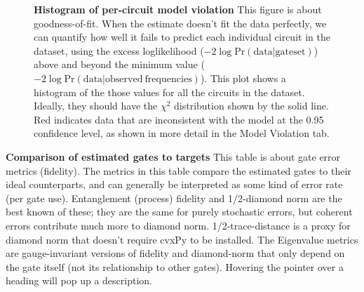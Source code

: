 \documentclass{article}[11pt]
\newcommand{\putfield}[2]{#2}
\begin{document}
\begin{figure}
  \begin{center}
    \begin{adjustbox}{max width=\textwidth}
      \putfield{final_model_fit_histogram}{}
    \end{adjustbox}
    \caption{\textbf{Histogram of per-circuit model violation} This figure is about goodness-of-fit.  When the estimate doesn't fit the data perfectly, we can quantify how well it fails to predict each individual circuit in the dataset, using the excess loglikelihood ($-2\log\mathrm{Pr}(\mathrm{data}|\mathrm{gateset})$) above and beyond the minimum value ($-2 \log \mathrm{Pr}(\mathrm{data}|\mathrm{observed\ frequencies})$).  This plot shows a histogram of the those values for all the circuits in the dataset.  Ideally, they should have the $\chi^2$ distribution shown by the solid line.  Red indicates data that are inconsistent with the model at the 0.95 confidence level, as shown in more detail in the Model Violation tab.}
  \end{center}
\end{figure}


\begin{table}
  \begin{center}
    \begin{adjustbox}{max width=\textwidth}
      \putfield{final_gates_vs_target_table_insummary}{}
    \end{adjustbox}
    \caption{\textbf{Comparison of estimated gates to targets} This table is about gate error metrics (fidelity). The metrics in this table compare the estimated gates to their ideal counterparts, and can generally be interpreted as some kind of error rate (per gate use).  Entanglement (process) fidelity and 1/2-diamond norm are the best known of these; they are the same for purely stochastic errors, but coherent errors contribute much more to diamond norm.  1/2-trace-distance is a proxy for diamond norm that doesn't require cvxPy to be installed.  The Eigenvalue metrics are gauge-invariant versions of fidelity and diamond-norm that only depend on the gate itself (not its relationship to other gates).  Hovering the pointer over a heading will pop up a description.}
  \end{center}
\end{table}
\end{document}
